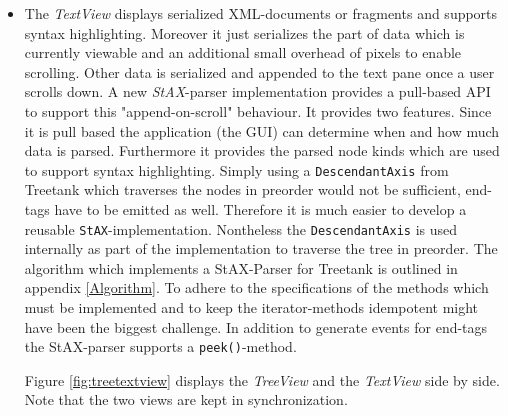 \begin{itemize}
\item
The \emph{TextView} displays serialized XML-documents or fragments and supports syntax highlighting. Moreover it just serializes the part of data which is currently viewable and an additional small overhead of pixels to enable scrolling. Other data is serialized and appended to the text pane once a user scrolls down. A new \emph{StAX}-parser implementation provides a pull-based API to support this "append-on-scroll" behaviour. It provides two features. Since it is pull based the application (the GUI) can determine when and how much data is parsed. Furthermore it provides the parsed node kinds which are used to support syntax highlighting. Simply using a \texttt{DescendantAxis} from Treetank which traverses the nodes in preorder would not be sufficient, end-tags have to be emitted as well. Therefore it is much easier to develop a reusable \texttt{StAX}-implementation. Nontheless the \texttt{DescendantAxis} is used internally as part of the implementation to traverse the tree in preorder. The algorithm which implements a StAX-Parser for Treetank is outlined in appendix \ref{Algorithm}. To adhere to the specifications of the methods which must be implemented and to keep the iterator-methods idempotent might have been the biggest challenge. In addition to generate events for end-tags the StAX-parser supports a \texttt{peek()}-method.

Figure \ref{fig:treetextview} displays the \emph{TreeView} and the \emph{TextView} side by side. Note that the two views are kept in synchronization.


\end{itemize}
